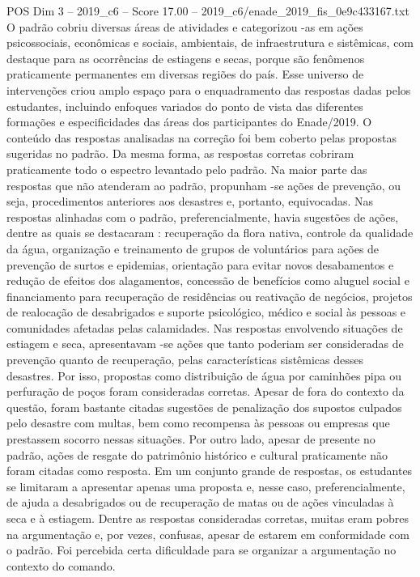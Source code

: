 \begin{textsample}{POS Dim 3 – 2019\_c6 – Score 17.00 – 2019\_c6/enade\_2019\_fis\_0e9c433167.txt}
O padrão cobriu diversas áreas de atividades e categorizou -as em ações psicossociais, econômicas e sociais, ambientais, de infraestrutura e sistêmicas, com destaque para as ocorrências de estiagens e secas, porque são fenômenos praticamente permanentes em diversas regiões do país.
Esse universo de intervenções criou amplo espaço para o enquadramento das respostas dadas pelos estudantes, incluindo enfoques variados do ponto de vista das diferentes formações e especificidades das áreas dos participantes do Enade/2019.
O conteúdo das respostas analisadas na correção foi bem coberto pelas propostas sugeridas no padrão.
Da mesma forma, as respostas corretas cobriram praticamente todo o espectro levantado pelo padrão.
Na maior parte das respostas que não atenderam ao padrão, propunham -se ações de prevenção, ou seja, procedimentos anteriores aos desastres e, portanto, equivocadas.
Nas respostas alinhadas com o padrão, preferencialmente, havia sugestões de ações, dentre as quais se destacaram : recuperação da flora nativa, controle da qualidade da água, organização e treinamento de grupos de voluntários para ações de prevenção de surtos e epidemias, orientação para evitar novos desabamentos e redução de efeitos dos alagamentos, concessão de benefícios como aluguel social e financiamento para recuperação de residências ou reativação de negócios, projetos de realocação de desabrigados e suporte psicológico, médico e social às pessoas e comunidades afetadas pelas calamidades.
Nas respostas envolvendo situações de estiagem e seca, apresentavam -se ações que tanto poderiam ser consideradas de prevenção quanto de recuperação, pelas características sistêmicas desses desastres.
Por isso, propostas como distribuição de água por caminhões pipa ou perfuração de poços foram consideradas corretas.
Apesar de fora do contexto da questão, foram bastante citadas sugestões de penalização dos supostos culpados pelo desastre com multas, bem como recompensa às pessoas ou empresas que prestassem socorro nessas situações.
Por outro lado, apesar de presente no padrão, ações de resgate do patrimônio histórico e cultural praticamente não foram citadas como resposta.
Em um conjunto grande de respostas, os estudantes se limitaram a apresentar apenas uma proposta e, nesse caso, preferencialmente, de ajuda a desabrigados ou de recuperação de matas ou de ações vinculadas à seca e à estiagem.
Dentre as respostas consideradas corretas, muitas eram pobres na argumentação e, por vezes, confusas, apesar de estarem em conformidade com o padrão.
Foi percebida certa dificuldade para se organizar a argumentação no contexto do comando.

\end{textsample}
